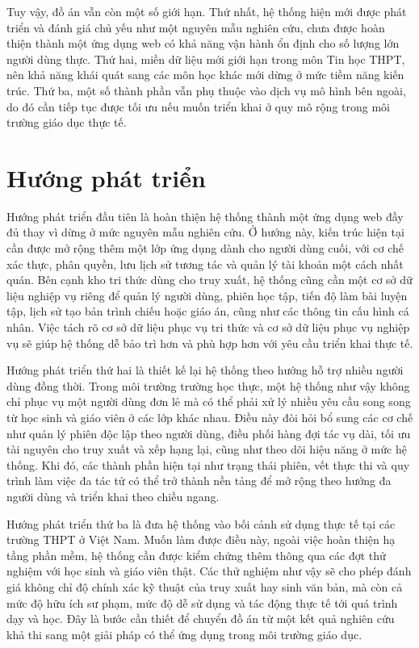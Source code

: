\documentclass[../DoAn.tex]{subfiles}
\begin{document}
Tuy vậy, đồ án vẫn còn một số giới hạn. Thứ nhất, hệ thống hiện mới được phát triển và đánh giá chủ yếu như một nguyên mẫu nghiên cứu, chưa được hoàn thiện thành một ứng dụng web có khả năng vận hành ổn định cho số lượng lớn người dùng thực. Thứ hai, miền dữ liệu mới giới hạn trong môn Tin học THPT, nên khả năng khái quát sang các môn học khác mới dừng ở mức tiềm năng kiến trúc. Thứ ba, một số thành phần vẫn phụ thuộc vào dịch vụ mô hình bên ngoài, do đó cần tiếp tục được tối ưu nếu muốn triển khai ở quy mô rộng trong môi trường giáo dục thực tế.

\section{Hướng phát triển}

Hướng phát triển đầu tiên là hoàn thiện hệ thống thành một ứng dụng web đầy đủ thay vì dừng ở mức nguyên mẫu nghiên cứu. Ở hướng này, kiến trúc hiện tại cần được mở rộng thêm một lớp ứng dụng dành cho người dùng cuối, với cơ chế xác thực, phân quyền, lưu lịch sử tương tác và quản lý tài khoản một cách nhất quán. Bên cạnh kho tri thức dùng cho truy xuất, hệ thống cũng cần một cơ sở dữ liệu nghiệp vụ riêng để quản lý người dùng, phiên học tập, tiến độ làm bài luyện tập, lịch sử tạo bản trình chiếu hoặc giáo án, cũng như các thông tin cấu hình cá nhân. Việc tách rõ cơ sở dữ liệu phục vụ tri thức và cơ sở dữ liệu phục vụ nghiệp vụ sẽ giúp hệ thống dễ bảo trì hơn và phù hợp hơn với yêu cầu triển khai thực tế.

Hướng phát triển thứ hai là thiết kế lại hệ thống theo hướng hỗ trợ nhiều người dùng đồng thời. Trong môi trường trường học thực, một hệ thống như vậy không chỉ phục vụ một người dùng đơn lẻ mà có thể phải xử lý nhiều yêu cầu song song từ học sinh và giáo viên ở các lớp khác nhau. Điều này đòi hỏi bổ sung các cơ chế như quản lý phiên độc lập theo người dùng, điều phối hàng đợi tác vụ dài, tối ưu tài nguyên cho truy xuất và xếp hạng lại, cũng như theo dõi hiệu năng ở mức hệ thống. Khi đó, các thành phần hiện tại như trạng thái phiên, vết thực thi và quy trình làm việc đa tác tử có thể trở thành nền tảng để mở rộng theo hướng đa người dùng và triển khai theo chiều ngang.

Hướng phát triển thứ ba là đưa hệ thống vào bối cảnh sử dụng thực tế tại các trường THPT ở Việt Nam. Muốn làm được điều này, ngoài việc hoàn thiện hạ tầng phần mềm, hệ thống cần được kiểm chứng thêm thông qua các đợt thử nghiệm với học sinh và giáo viên thật. Các thử nghiệm như vậy sẽ cho phép đánh giá không chỉ độ chính xác kỹ thuật của truy xuất hay sinh văn bản, mà còn cả mức độ hữu ích sư phạm, mức độ dễ sử dụng và tác động thực tế tới quá trình dạy và học. Đây là bước cần thiết để chuyển đồ án từ một kết quả nghiên cứu khả thi sang một giải pháp có thể ứng dụng trong môi trường giáo dục.
\end{document}
